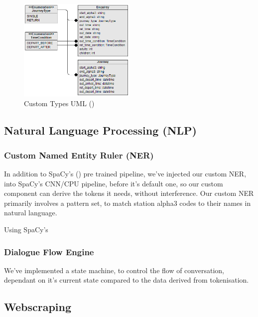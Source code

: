 \documentclass[11pt]{article}
\begin{document}
\begin{figure}[h]
    \centering
    \includegraphics[width=0.5\textwidth]{images/UML_utils.png}
    \caption{Custom Types UML (\cite{visual-paradigm})}
    \label{fig:custom-types-uml}
\end{figure}


\subsection{Natural Language Processing (NLP)} \label{nlp-design}

\subsubsection{Custom Named Entity Ruler (NER)} \label{named-entity-ruler-design}

In addition to SpaCy's (\cite{spacy}) pre trained pipeline, we've injected our custom NER, into SpaCy's CNN/CPU pipeline, before it's default one, so our custom component can derive the tokens it needs, without interference. Our custom NER primarily involves a pattern set, to match station alpha3 codes to their names in natural language.

Using SpaCy's 


\subsubsection{Dialogue Flow Engine} \label{dialogue-flow-design}

We've implemented a state machine, to control the flow of conversation, dependant on it's current state compared to the data derived from tokenisation.


\subsection{Webscraping} \label{webscraping-design}
\end{document}
